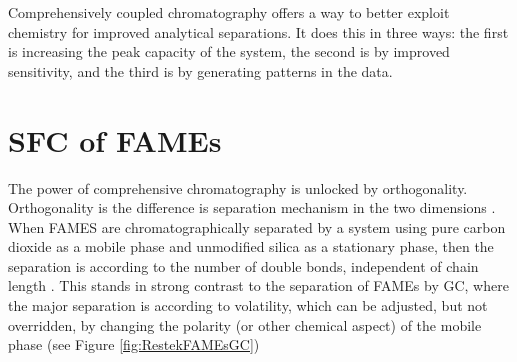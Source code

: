 Comprehensively coupled chromatography offers a way to better exploit chemistry
for improved analytical separations. It does this in three ways: the first is
increasing the peak capacity of the system, the second is by improved
sensitivity, and the third is by generating patterns in the data.

\section{SFC of FAMEs}

The power of comprehensive chromatography is unlocked by orthogonality.
Orthogonality is the difference is separation mechanism in the two dimensions
\autocite{Marriott2012}. When FAMES are chromatographically separated
by a system using pure carbon dioxide as a mobile phase and unmodified silica as
a stationary phase, then the separation is according to the number of double
bonds, independent of chain length \autocite{Robertson1991, Smith1994,
Smith2001}. This stands in strong contrast to the separation of FAMEs by GC, where
the major separation is according to volatility, which can be adjusted, but not
overridden, by changing the polarity (or other chemical aspect) of the mobile
phase (see Figure \ref{fig:RestekFAMEsGC}) 

